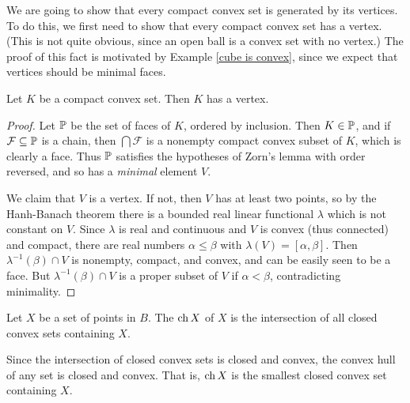 \begin{subsec}
We are going to show that every compact convex set is generated by its vertices.
To do this, we first need to show that every compact convex set has a vertex.
(This is not quite obvious, since an open ball is a convex set with no vertex.)
The proof of this fact is motivated by Example \ref{cube is convex}, since we expect that vertices should be minimal faces.
\end{subsec}

\begin{lemma}
\label{vertices exist}
Let $K$ be a compact convex set. Then $K$ has a vertex.
\end{lemma}
\begin{proof}
Let $\mathbb{P}$ be the set of faces of $K$, ordered by inclusion.
Then $K \in \mathbb{P}$, and if $\mathcal F \subseteq \mathbb{P}$ is a chain, then $\bigcap \mathcal F$ is a nonempty compact convex subset of $K$, which is clearly a face.
Thus $\mathbb{P}$ satisfies the hypotheses of Zorn's lemma with order reversed, and so has a \emph{minimal} element $V$.

We claim that $V$ is a vertex. If not, then $V$ has at least two points, so by the Hanh-Banach theorem there is a bounded real linear functional $\lambda$ which is not constant on $V$.
Since $\lambda$ is real and continuous and $V$ is convex (thus connected) and compact, there are real numbers $\alpha \leq \beta$ with $\lambda(V) = [\alpha, \beta]$.
Then $\lambda^{-1}(\beta) \cap V$ is nonempty, compact, and convex, and can be easily seen to be a face.
But $\lambda^{-1}(\beta) \cap V$ is a proper subset of $V$ if $\alpha < \beta$, contradicting minimality.
\end{proof}

\begin{definition}
Let $X$ be a set of points in $B$. The  $\operatorname{ch} X$ of $X$ is the intersection of all closed convex sets containing $X$.
\end{definition}

\begin{subsec}
Since the intersection of closed convex sets is closed and convex, the convex hull of any set is closed and convex.
That is, $\operatorname{ch} X$ is the smallest closed convex set containing $X$.
\end{subsec}

